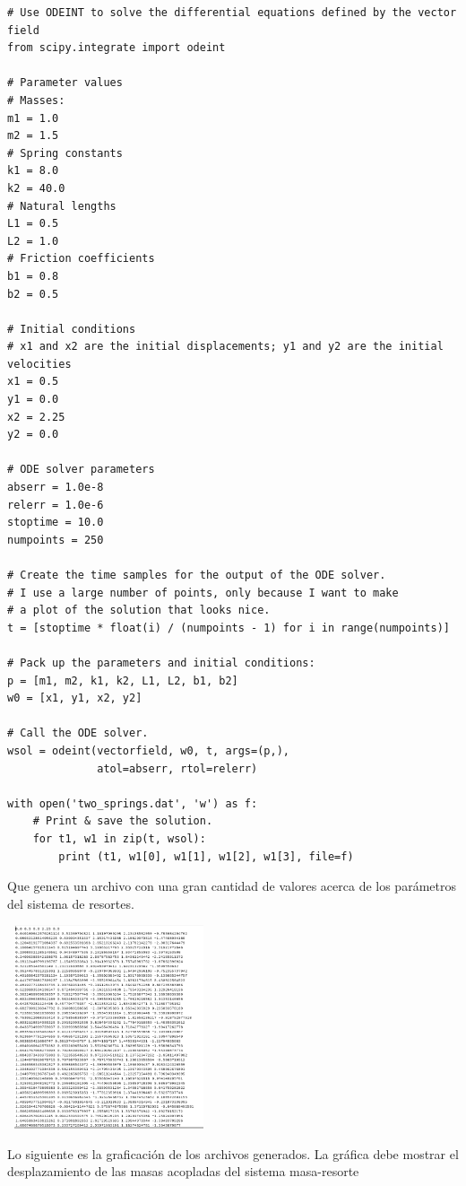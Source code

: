 \documentclass{article}
\begin{document}
\begin{verbatim}
# Use ODEINT to solve the differential equations defined by the vector field
from scipy.integrate import odeint

# Parameter values
# Masses:
m1 = 1.0
m2 = 1.5
# Spring constants
k1 = 8.0
k2 = 40.0
# Natural lengths
L1 = 0.5
L2 = 1.0
# Friction coefficients
b1 = 0.8
b2 = 0.5

# Initial conditions
# x1 and x2 are the initial displacements; y1 and y2 are the initial velocities
x1 = 0.5
y1 = 0.0
x2 = 2.25
y2 = 0.0

# ODE solver parameters
abserr = 1.0e-8
relerr = 1.0e-6
stoptime = 10.0
numpoints = 250

# Create the time samples for the output of the ODE solver.
# I use a large number of points, only because I want to make
# a plot of the solution that looks nice.
t = [stoptime * float(i) / (numpoints - 1) for i in range(numpoints)]

# Pack up the parameters and initial conditions:
p = [m1, m2, k1, k2, L1, L2, b1, b2]
w0 = [x1, y1, x2, y2]

# Call the ODE solver.
wsol = odeint(vectorfield, w0, t, args=(p,),
              atol=abserr, rtol=relerr)

with open('two_springs.dat', 'w') as f:
    # Print & save the solution.
    for t1, w1 in zip(t, wsol):
        print (t1, w1[0], w1[1], w1[2], w1[3], file=f)
\end{verbatim}
 
 Que genera un archivo con una gran cantidad de valores acerca de los parámetros del sistema de resortes.
 
\begin{center}
  \includegraphics[width=6cm, height=6cm]{ejdat.png}
\end{center}

Lo siguiente es la graficación de los archivos generados. La gráfica debe mostrar el desplazamiento de las masas acopladas del sistema masa-resorte
\end{document}
